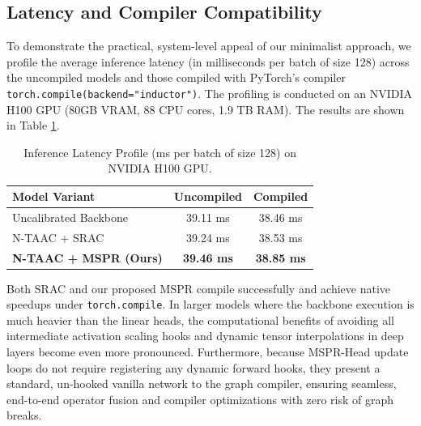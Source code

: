 \documentclass{article}
\theoremstyle{plain}
\theoremstyle{definition}
\theoremstyle{remark}
\begin{document}
\subsection{Latency and Compiler Compatibility}
To demonstrate the practical, system-level appeal of our minimalist approach, we profile the average inference latency (in milliseconds per batch of size 128) across the uncompiled models and those compiled with PyTorch's compiler \texttt{torch.compile(backend="inductor")}. The profiling is conducted on an NVIDIA H100 GPU (80GB VRAM, 88 CPU cores, 1.9 TB RAM). The results are shown in Table \ref{table-latency}.

\begin{table}[t]
\caption{Inference Latency Profile (ms per batch of size 128) on NVIDIA H100 GPU.}
\label{table-latency}
\vskip 0.05in
\begin{center}
\begin{footnotesize}
\begin{tabular}{lcc}
\toprule
Model Variant & Uncompiled & Compiled \\
\midrule
Uncalibrated Backbone & 39.11 ms & 38.46 ms \\
N-TAAC + SRAC & 39.24 ms & 38.53 ms \\
\textbf{N-TAAC + MSPR (Ours)} & \textbf{39.46 ms} & \textbf{38.85 ms} \\
\bottomrule
\end{tabular}
\end{footnotesize}
\end{center}
\vskip -0.15in
\end{table}

Both SRAC and our proposed MSPR compile successfully and achieve native speedups under \texttt{torch.compile}. In larger models where the backbone execution is much heavier than the linear heads, the computational benefits of avoiding all intermediate activation scaling hooks and dynamic tensor interpolations in deep layers become even more pronounced. Furthermore, because MSPR-Head update loops do not require registering any dynamic forward hooks, they present a standard, un-hooked vanilla network to the graph compiler, ensuring seamless, end-to-end operator fusion and compiler optimizations with zero risk of graph breaks.
\end{document}
